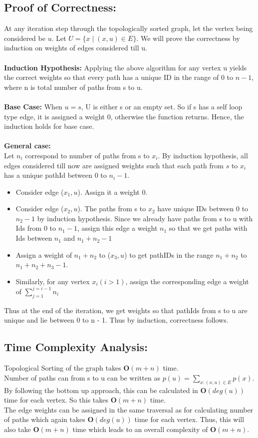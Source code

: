 \documentclass{article}
\begin{document}
\subsection{Proof of Correctness:}
At any iteration step through the topologically sorted graph, let the vertex being considered be $u$. Let $U = \{x \; | \; (x,u) \in E\}$. We will prove the correctness by induction on weights of edges considered till u.\\\\
\textbf{Induction Hypothesis:} Applying the above algorithm for any vertex u yields the correct weights so that every path has a unique ID in the range of 0 to $n-1$, where n is total number of paths from s to u.\\\\
\textbf{Base Case:} When $u = s$, U is either {s} or an empty set. So if s has a self loop type edge, it is assigned a weight 0, otherwise the function returns. Hence, the induction  holds for base case.\\\\
\textbf{General case:}\\
Let $n_i$ correspond to number of paths from s to $x_i$. By  induction  hypothesis, all edges considered till now are assigned weights such that each path from $s$ to $x_i$ has a unique pathId between 0 to $n_i - 1$.
\begin{itemize}
	\item Consider edge ($x_1, u$). Assign it a weight 0.
	\item Consider edge ($x_2, u$). The paths from s to $x_2$ have unique IDs between 0 to $n_2 -1$ by induction hypothesis. Since we already have paths from s to u with Ids from 0 to $n_1 - 1$, assign this edge a weight $n_1$ so that we get paths with Ids between $n_1$ and $n_1 + n_2 - 1$
	\item Assign a weight of $n_1 + n_2$ to ($x_3, u$) to get pathIDs in the range $n_1 + n_2$ to $n_1 + n_2 + n_3 - 1$.
	\item Similarly, for any vertex $x_i(i > 1)$, assign the corresponding edge a weight of $\sum_{j=1}^{j=i-1} n_i$
\end{itemize}
Thus at the end of the iteration, we get weights so that pathIds from s to u are unique and lie between 0 to n - 1. Thus by induction, correctness follows. 

\subsection{Time Complexity Analysis:}
Topological Sorting of the graph takes $\mathbf{O}(m+n)$ time.\\
Number of paths can from s to u can be written as $p(u) = \sum_{x:(x,u) \in E} p(x)$. By following the bottom up approach, this can be calculated in $\mathbf{O}(deg(u))$ time for each vertex. So this takes $\mathbf{O}(m+n)$ time.\\
The edge weights can be assigned in the same traversal as for calculating number of paths which again takes $\mathbf{O}(deg(u))$ time for each vertex. Thus, this will also take $\mathbf{O}(m+n)$  time which leads to an overall complexity of $\mathbf{O}(m+n)$.
\end{document}
